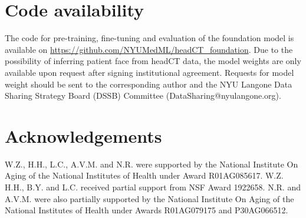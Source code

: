 \documentclass[fleqn,10pt]{wlscirep}
\begin{document}
\section*{Code availability}
The code for pre-training, fine-tuning and evaluation of the foundation model is available on \url{https://github.com/NYUMedML/headCT_foundation}. Due to the possibility of inferring patient face from headCT data, the model weights are only available upon request after signing institutional agreement. Requests for model weight should be sent to the corresponding author and the NYU Langone Data Sharing Strategy Board (DSSB) Committee (DataSharing@nyulangone.org).

\section*{Acknowledgements}
W.Z., H.H., L.C., A.V.M. and N.R. were supported by the National Institute On Aging of the National Institutes of Health under Award R01AG085617. W.Z. H.H., B.Y. and L.C. received partial support from NSF Award 1922658. N.R. and A.V.M. were also partially supported by the National Institute On Aging of the National Institutes of Health under Awards R01AG079175 and P30AG066512.








\end{document}
